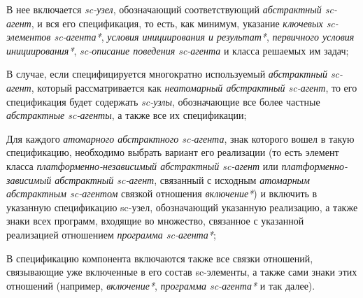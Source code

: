 \begin{SCn}
\begin{scnsubstruct}
{		\begin{scnitemize}
			\item В нее включается \textit{sc-узел}, обозначающий соответствующий \textit{абстрактный sc-агент}, и вся его спецификация, то есть, как минимум, указание \textit{ключевых sc-элементов sc-агента*}, \textit{условия инициирования и результат*}, \textit{первичного условия инициирования*}, \textit{sc-описание поведения sc-агента} и класса решаемых им задач;
			\item В случае, если специфицируется многократно используемый \textit{абстрактный sc-агент}, который рассматривается как \textit{неатомарный абстрактный sc-агент}, то его спецификация  будет содержать \textit{sc-узлы}, обозначающие все более частные \textit{абстрактные sc-агенты}, а также все их спецификации;
			\item Для каждого \textit{атомарного абстрактного sc-агента}, знак которого вошел в такую спецификацию, необходимо выбрать вариант его реализации (то есть элемент класса \textit{платформенно-независимый абстрактный sc-агент} или \textit{платформенно-зависимый абстрактный sc-агент}, связанный с исходным \textit{атомарным абстрактным sc-агентом} связкой отношения \textit{включение*}) и включить в указанную спецификацию sc-узел, обозначающий указанную реализацию, а также знаки всех программ, входящие во множество, связанное с указанной реализацией отношением \textit{программа sc-агента*};
			\item В спецификацию компонента включаются также все связки отношений, связывающие уже включенные в его состав sc-элементы, а также сами знаки этих отношений (например, \textit{включение*}, \textit{программа sc-агента*} и так далее).
		\end{scnitemize}}
		
		
		

\end{scnsubstruct}
\end{SCn}

